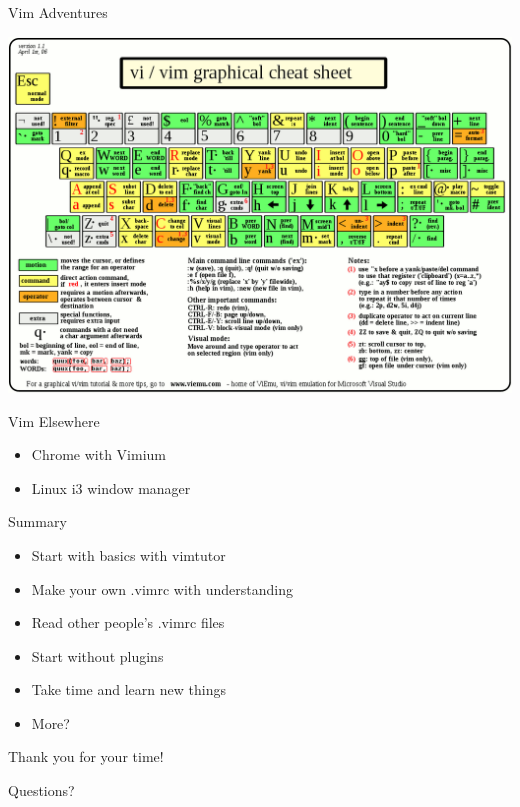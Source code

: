 \documentclass{beamer}
\begin{document}
\begin{frame}{Vim Adventures}
\end{frame}

\begin{frame}
    \begin{center}
        \includegraphics[width=1\textwidth]{images/cheat-sheet.png}
    \end{center}
\end{frame}

\begin{frame}{Vim Elsewhere}
    \begin{itemize}
        \item Chrome with Vimium
        \item Linux i3 window manager
    \end{itemize}
\end{frame}

\begin{frame}{Summary}
    \begin{itemize}
        \item Start with basics with vimtutor
        \item Make your own .vimrc with understanding
        \item Read other people's .vimrc files
        \item Start without plugins
        \item Take time and learn new things
        \item More?
    \end{itemize}
\end{frame}

\begin{frame}
    \begin{center}
        \huge Thank you for your time!
    \end{center}
    \begin{center}
        Questions?
    \end{center}
\end{frame}
\end{document}
